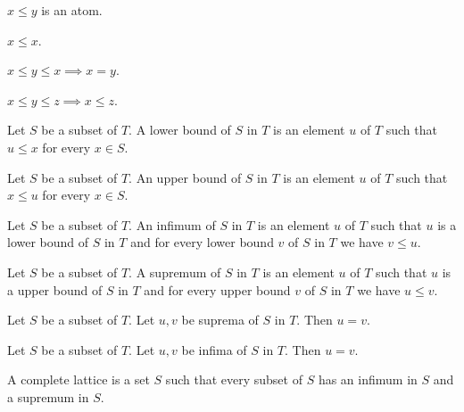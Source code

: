 \documentclass{article}
\begin{document}
  \begin{forthel}

    \begin{signature}[LessRel]
      $x \leq y$ is an atom.
    \end{signature}

    \begin{axiom}[ARefl]
      $x \leq x$.
    \end{axiom}

    \begin{axiom}[ASymm]
      $x \leq y \leq x \implies x = y$.
    \end{axiom}

    \begin{axiom}[ATrans]
      $x \leq y \leq z \implies x \leq z$.
    \end{axiom}

    \begin{definition}[DefLB]
      Let $S$ be a subset of $T$. A lower bound of $S$ in $T$ is an element $u$ of $T$ such that
      $u \leq x$ for every $x \in S$.
    \end{definition}

    \begin{definition}[DefUB]
      Let $S$ be a subset of $T$. An upper bound of $S$ in $T$ is an element $u$ of $T$ such that
      $x \leq u$ for every $x \in S$.
    \end{definition}

    \begin{definition}[DefInf]
      Let $S$ be a subset of $T$. An infimum of $S$ in $T$ is an element $u$ of $T$ such that
      $u$ is a lower bound of $S$ in $T$ and for every lower bound $v$ of $S$ in $T$ we have $v \leq u$.
    \end{definition}

    \begin{definition}[DefSup]
      Let $S$ be a subset of $T$. A supremum of $S$ in $T$ is an element $u$ of $T$ such that
      $u$ is a upper bound of $S$ in $T$ and for every upper bound $v$ of $S$ in $T$ we have $u \leq v$.
    \end{definition}

    \begin{lemma}[SupUn]
      Let $S$ be a subset of $T$. Let $u,v$ be suprema of $S$ in $T$. Then $u = v$.
    \end{lemma}

    \begin{lemma}[InfUn]
      Let $S$ be a subset of $T$. Let $u,v$ be infima of $S$ in $T$. Then $u = v$.
    \end{lemma}

    \begin{definition}[DefCLat]
      A complete lattice is a set $S$ such that every subset of $S$ has an infimum in $S$ and a supremum in $S$.
    \end{definition}
  \end{forthel}
\end{document}
